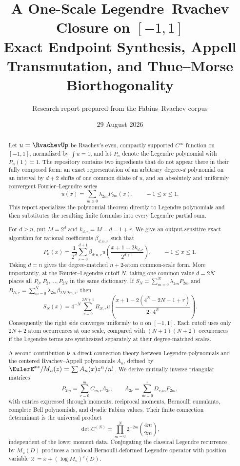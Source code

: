 \documentclass[11pt,oneside]{article}
\title{\bfseries A One-Scale Legendre--Rvachev Closure on $[-1,1]$\\[0.45em]
\Large Exact Endpoint Synthesis, Appell Transmutation, and Thue--Morse Biorthogonality}
\author{Research report prepared from the \Repo{} Fabius--Rvachev corpus}
\date{29 August 2026}
\theoremstyle{definition}
\theoremstyle{remark}
\newcommand{\cX}{\mathcal X}
\begin{document}
\maketitle

\begin{abstract}
Let $u=\RvachevUp$ be Rvachev's even, compactly supported $C^\infty$ function on
$[-1,1]$, normalized by $\int u=1$, and let $P_n$ denote the Legendre
polynomial with $P_n(1)=1$.  The repository contains two ingredients that do
not appear there in their fully composed form: an exact representation of an
arbitrary degree-$d$ polynomial on an interval by $d+2$ shifts of one common
dilate of $u$, and an absolutely and uniformly convergent Fourier--Legendre
series
\[
 u(x)=\sum_{m\ge0}\lambda_{2m}P_{2m}(x),\qquad -1\le x\le1.
\]
This report specializes the polynomial theorem directly to Legendre
polynomials and then substitutes the resulting finite formulas into every
Legendre partial sum.

For $d\ge n$, put $M=2^d$ and $k_{d,r}=M-d-1+r$.  We give an
output-sensitive exact algorithm for rational coefficients
$\beta_{d;n,r}$ such that
\[
 P_n(x)=\frac1{2^d}\sum_{r=0}^{d+1}\beta_{d;n,r}
 u\!\left(\frac{x+1-2k_{d,r}}{2^{d+1}}\right),
 \qquad -1\le x\le1.
\]
Taking $d=n$ gives the degree-matched $n+2$-atom common-scale form.  More
importantly, at the Fourier--Legendre cutoff $N$, taking one common value
$d=2N$ places all $P_0,P_2,\ldots,P_{2N}$ in the same dictionary.  If
$S_N=\sum_{m=0}^N\lambda_{2m}P_{2m}$ and
$B_{N,r}=\sum_{m=0}^N\lambda_{2m}\beta_{2N;2m,r}$, then
\[
 S_N(x)=4^{-N}\sum_{r=0}^{2N+1}B_{N,r}
 u\!\left(
 \frac{x+1-2(4^N-2N-1+r)}{2\cdot4^N}
 \right).
\]
Consequently the right side converges uniformly to $u$ on $[-1,1]$.  Each
cutoff uses only $2N+2$ atom occurrences at one scale, compared with
$(N+1)(N+2)$ occurrences if the Legendre terms are synthesized separately at
their degree-matched scales.

A second contribution is a direct connection theory between Legendre
polynomials and the centered Rvachev--Appell polynomials $A_n$, defined by
$\EulerE^{xz}/M_u(z)=\sum A_n(x)z^n/n!$.  We derive mutually inverse triangular
matrices
\[
 P_{2m}=\sum_{r=0}^m C_{m,r}A_{2r},\qquad
 A_{2r}=\sum_{m=0}^r D_{r,m}P_{2m},
\]
with entries expressed through moments, reciprocal moments, Bernoulli
cumulants, complete Bell polynomials, and dyadic Fabius values.  Their finite
connection determinant is the universal product
\[
 \det C^{(N)}=\prod_{m=0}^N2^{-2m}\binom{4m}{2m},
\]
independent of the lower moment data.  Conjugating the classical Legendre
recurrence by $M_u(D)$ produces a nonlocal Bernoulli-deformed Legendre
operator with position variable $\cX=x+(\log M_u)'(D)$.


\end{abstract}
\end{document}

